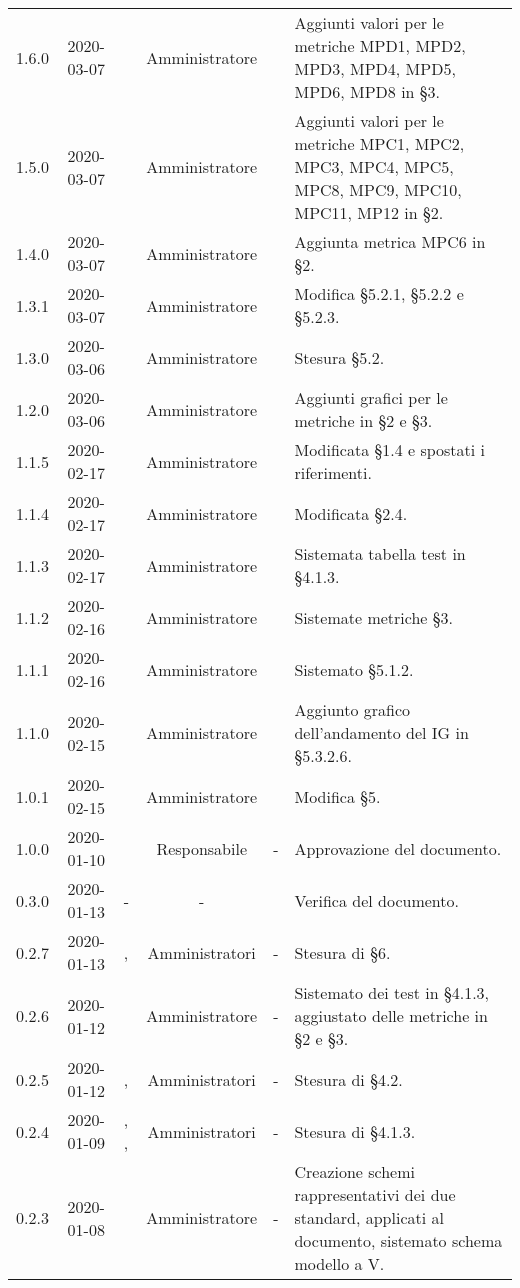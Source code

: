 {\begin{longtable}{ c c  C{2.3cm} c C{3cm} C{3.2cm}}
1.6.0 & 2020-03-07 & \CE{} & Amministratore & \AT{} & Aggiunti valori per le metriche MPD1, MPD2, MPD3, MPD4, MPD5, MPD6, MPD8 in §3. \\
1.5.0 & 2020-03-07 & \PF{} & Amministratore & \AT{} & Aggiunti valori per le metriche MPC1, MPC2, MPC3, MPC4, MPC5, MPC8, MPC9, MPC10, MPC11, MP12 in §2. \\
1.4.0 & 2020-03-07 & \DF{} & Amministratore & \AT{} & Aggiunta metrica MPC6 in §2. \\
1.3.1 & 2020-03-07 & \CE{} & Amministratore & \SE{} & Modifica §5.2.1, §5.2.2 e §5.2.3. \\
1.3.0 & 2020-03-06 & \PF{} & Amministratore & \AT{} & Stesura §5.2. \\
1.2.0 & 2020-03-06 & \PF{} & Amministratore & \SE{} & Aggiunti grafici per le metriche in §2 e §3. \\
1.1.5 & 2020-02-17 & \CE{} & Amministratore & \AT{} & Modificata §1.4 e spostati i riferimenti. \\
1.1.4 & 2020-02-17 & \PF{} & Amministratore & \AT{} & Modificata §2.4. \\
1.1.3 & 2020-02-17 & \DF{} & Amministratore & \AT{} & Sistemata tabella test in §4.1.3. \\
1.1.2 & 2020-02-16 & \CE{} & Amministratore & \SE{} & Sistemate metriche §3. \\
1.1.1 & 2020-02-16 & \PF{} & Amministratore & \AT{} & Sistemato §5.1.2. \\
1.1.0 & 2020-02-15 & \PF{} & Amministratore & \SE{} & Aggiunto grafico dell'andamento del IG in §5.3.2.6. \\
1.0.1 & 2020-02-15 & \PF{} & Amministratore & \AT{} & Modifica §5. \\
1.0.0 & 2020-01-10 & \SE{} & Responsabile & - & Approvazione del documento. \\
0.3.0 & 2020-01-13 & - & - & \LD{} & Verifica del documento. \\
0.2.7 & 2020-01-13 & \MC{}, \AT{} & Amministratori & - & Stesura di §6. \\
0.2.6 & 2020-01-12 & \AT{} & Amministratore & - & Sistemato dei test in §4.1.3, aggiustato delle metriche in §2 e §3. \\
0.2.5 & 2020-01-12 & \MC{}, \BR{} & Amministratori & - & Stesura di §4.2. \\
0.2.4 & 2020-01-09 & \MC{}, \AT{}, \BR{} & Amministratori & - & Stesura di §4.1.3. \\
0.2.3 & 2020-01-08 & \AT{} & Amministratore & - & Creazione schemi rappresentativi dei due standard, applicati al documento, sistemato schema modello a V. \\

\end{longtable}}
